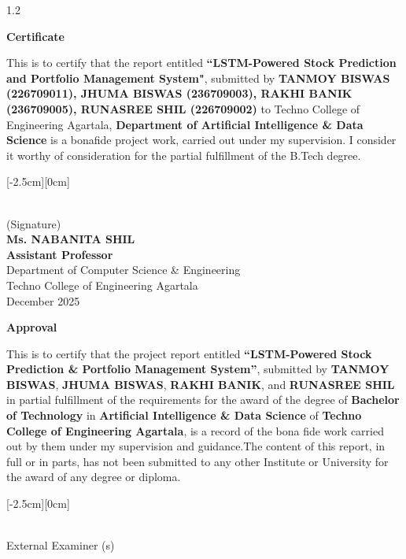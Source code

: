 \documentclass[12pt, a4paper]{report}
\begin{document}
\begin{spacing}{1.2}
\newpage
\thispagestyle{plain} %
\baselineskip \centerline{\LARGE{\bf Certificate}} \baselineskip 
\noindent
This is to certify that the report entitled {\bf ``LSTM-Powered Stock Prediction and Portfolio Management System"}, submitted by \textbf{TANMOY BISWAS (226709011), JHUMA BISWAS (236709003), RAKHI BANIK (236709005), RUNASREE SHIL (226709002)} to Techno College of Engineering Agartala, \textbf{Department of Artificial Intelligence \& Data Science} is a bonafide project work, carried out under my supervision. I consider it worthy of consideration for the partial fulfillment of the B.Tech degree. 

\vspace*{4cm}
\begin{flushleft}
    \raisebox{1.0cm}[-2.5cm][0cm]{
        \begin{minipage}{10cm}
            \hrulefill\\
            (Signature)\\
            \textbf{Ms. NABANITA SHIL} \\
            \textbf{Assistant Professor} \\
            Department of Computer Science \& Engineering \\
            Techno College of Engineering Agartala \\
            December 2025
        \end{minipage}
    }
\end{flushleft}        

\newpage
\thispagestyle{plain} %
\begin{center} {\LARGE \bf Approval} \end{center}
\vspace{1.5cm}
\noindent
This is to certify that the project report entitled \textbf{``LSTM-Powered Stock Prediction \& Portfolio Management System''}, submitted by \textbf{TANMOY BISWAS}, \textbf{JHUMA BISWAS}, \textbf{RAKHI BANIK}, and \textbf{RUNASREE SHIL} in partial fulfillment of the requirements for the award of the degree of \textbf{Bachelor of Technology} in \textbf{Artificial Intelligence \& Data Science} of \textbf{Techno College of Engineering Agartala}, is a record of the bona fide work carried out by them under my supervision and guidance.The content of this report, in full or in parts, has not been submitted to any other Institute or University for the award of any degree or diploma.\\ 
\vspace*{3cm}
\begin{flushleft}
    \raisebox{1.0cm}[-2.5cm][0cm]{
        \begin{minipage}{7.5cm}
            \hrulefill\\
            External Examiner (s)
        \end{minipage}
    }
\end{flushleft}


\end{spacing}
\end{document}
